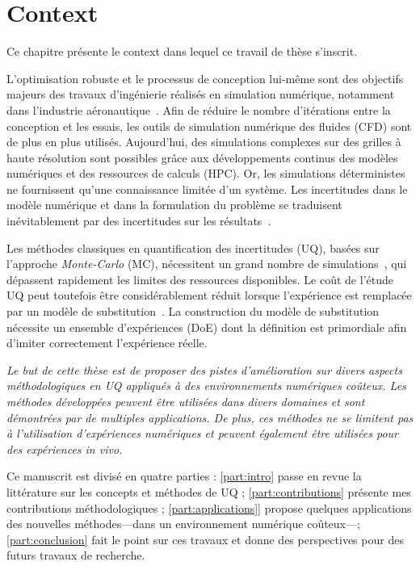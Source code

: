 \chapter{Context}

\begin{chapquote}
Ce chapitre présente le context dans lequel ce travail de thèse s'inscrit.

L'optimisation robuste et le processus de conception lui-même sont des objectifs majeurs des travaux d'ingénierie réalisés en simulation numérique, notamment dans l'industrie aéronautique~\cite{duchaine2009}. Afin de réduire le nombre d'itérations entre la conception et les essais, les outils de simulation numérique des fluides (CFD) sont de plus en plus utilisés. Aujourd'hui, des simulations complexes sur des grilles à haute résolution sont possibles grâce aux développements continus des modèles numériques et des ressources de calculs (HPC). Or, les simulations déterministes ne fournissent qu'une connaissance limitée d'un système. Les incertitudes dans le modèle numérique et dans la formulation du problème se traduisent inévitablement par des incertitudes sur les résultats~\cite{Sacks1989}. 

Les méthodes classiques en quantification des incertitudes (UQ), basées sur l'approche \emph{Monte-Carlo} (MC), nécessitent un grand nombre de simulations~\cite{Saltelli2007}, qui dépassent rapidement les limites des ressources disponibles. Le coût de l'étude UQ peut toutefois être considérablement réduit lorsque l'expérience est remplacée par un modèle de substitution~\cite{martin2005}. La construction du modèle de substitution nécessite un ensemble d'expériences (DoE) dont la définition est primordiale afin d'imiter correctement l'expérience réelle.

\emph{
Le but de cette thèse est de proposer des pistes d'amélioration sur divers aspects méthodologiques en UQ appliqués à des environnements numériques coûteux. Les méthodes développées peuvent être utilisées dans divers domaines et sont démontrées par de multiples applications. De plus, ces méthodes ne se limitent pas à l'utilisation d'expériences numériques et peuvent également être utilisées pour des expériences in vivo.    	
}

Ce manuscrit est divisé en quatre parties : \cref{part:intro} passe en revue la littérature sur les concepts et méthodes de UQ ; \cref{part:contributions} présente mes contributions méthodologiques ; \cref{part:applications}] propose quelques applications des nouvelles méthodes---dans un environnement numérique coûteux---; \cref{part:conclusion} fait le point sur ces travaux et donne des perspectives pour des futurs travaux de recherche.
\end{chapquote}


